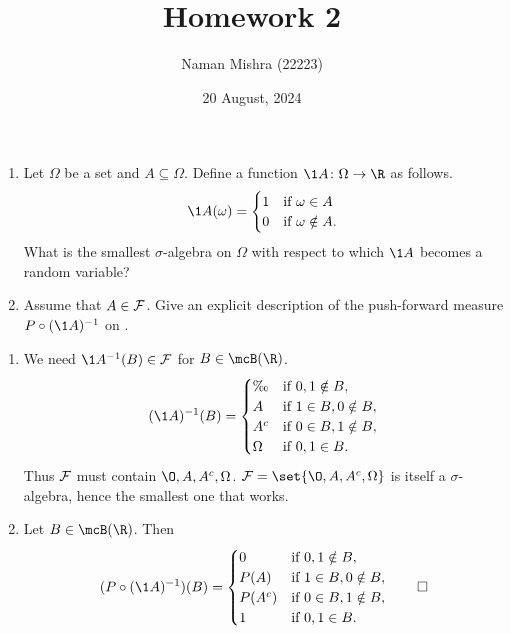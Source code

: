\documentclass[12pt]{article}
\title{Homework 2}
\author{Naman Mishra (22223)}
\date{20 August, 2024}
\begin{document}
\maketitle

\begin{problem} \leavevmode
    \begin{enumerate}
        \item Let $\Omega$ be a set and $A \subseteq \Omega$.
        Define a function $\1A\colon \Omega \to \R$ as follows. \[
            \1A(\omega) = \begin{cases}
                1 & \text{if } \omega \in A \\
                0 & \text{if } \omega \notin A.
            \end{cases}
        \] What is the smallest $\sigma$-algebra on $\Omega$ with respect to
        which $\1A$ becomes a random variable?
        \item Assume that $A \in \mathcal F$.
        Give an explicit description of the push-forward measure
        $P \circ (\1A)^{-1}$ on \R.
    \end{enumerate}
\end{problem}
\begin{solution} \leavevmode
    \begin{enumerate}
        \item We need $\1A^{-1}(B) \in \F$ for $B \in \mcB(\R)$. \[
                (\1A)^{-1}(B) = \begin{cases}
                    \O & \text{if } 0, 1 \notin B, \\
                    A & \text{if } 1 \in B, 0 \notin B, \\
                    A^c & \text{if } 0 \in B, 1 \notin B, \\
                    \Omega & \text{if } 0, 1 \in B.
                \end{cases}
            \]
            Thus $\mathcal F$ must contain $\O, A, A^c, \Omega$.
            $\F = \set{\O, A, A^c, \Omega}$ is itself a $\sigma$-algebra,
            hence the smallest one that works.
        \item Let $B \in \mcB(\R)$. Then \[
        (P \circ (\1A)^{-1})(B) = \begin{cases}
                0 & \text{if } 0, 1 \notin B, \\
                P(A) & \text{if } 1 \in B, 0 \notin B, \\
                P(A^c) & \text{if } 0 \in B, 1 \notin B, \\
                1 & \text{if } 0, 1 \in B.
            \end{cases} \qedhere
        \]
    \end{enumerate}
\end{solution}
\end{document}
